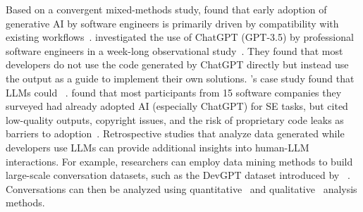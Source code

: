Based on a convergent mixed-methods study, \citeauthor{DBLP:journals/tosem/Russo24} found that early adoption of generative AI by software engineers is primarily driven by compatibility with existing workflows~\cite{DBLP:journals/tosem/Russo24}.
\citeauthor{DBLP:journals/pacmse/KhojahM0N24} investigated the use of ChatGPT (GPT-3.5) by professional software engineers in a week-long observational study~\cite{DBLP:journals/pacmse/KhojahM0N24}.
They found that most developers do not use the code generated by ChatGPT directly but instead use the output as a guide to implement their own solutions.
\citeauthor{DBLP:conf/csee/AzanzaPIG24}'s case study found that LLMs could ~\cite{DBLP:conf/csee/AzanzaPIG24}. 
 \citeauthor{DBLP:conf/icsa/JahicS24} found that most participants from 15 software companies they surveyed had already adopted AI (especially ChatGPT) for SE tasks, but cited low-quality outputs, copyright issues, and the risk of proprietary code leaks as barriers to adoption~\cite{DBLP:conf/icsa/JahicS24}. 
Retrospective studies that analyze data generated while developers use LLMs can provide additional insights into human-LLM interactions.
For example, researchers can employ data mining methods to build large-scale conversation datasets, such as the DevGPT dataset introduced by \citeauthor{DBLP:conf/msr/XiaoTHM24}~\cite{DBLP:conf/msr/XiaoTHM24}.
Conversations can then be analyzed using quantitative~\cite{DBLP:conf/msr/RabbiCZI24} and qualitative~\cite{DBLP:conf/msr/MohamedPP24} analysis methods.
